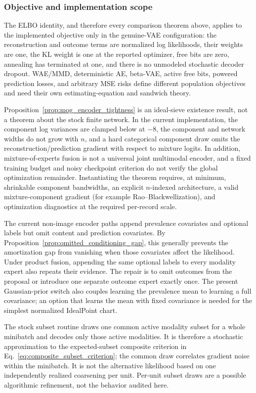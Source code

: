 \subsubsection{Objective and implementation scope}
\label{subsubsec:theory_code_scope}

The ELBO identity, and therefore every comparison theorem above, applies to
the implemented objective only in the genuine-VAE configuration: the
reconstruction and outcome terms are normalized log likelihoods, their
weights are one, the KL weight is one at the reported optimizer, free bits are
zero, annealing has terminated at one, and there is no unmodeled stochastic
decoder dropout.  WAE/MMD, deterministic AE, beta-VAE, active free bits,
powered prediction losses, and arbitrary MSE risks define different
population objectives and need their own estimating-equation and sandwich
theory.

Proposition~\ref{prop:mog_encoder_tightness} is an ideal-sieve existence
result, not a theorem about the stock finite network.  In the current
implementation, the component log variances are clamped below at $-8$, the
component and network widths do not grow with $n$, and a hard categorical
component draw omits the reconstruction/prediction gradient with respect to
mixture logits.  In addition, mixture-of-experts fusion is not a universal
joint multimodal encoder, and a fixed training budget and noisy checkpoint
criterion do not verify the global optimization remainder.  Instantiating the
theorem requires, at minimum, shrinkable component bandwidths, an explicit
$n$-indexed architecture, a valid mixture-component gradient (for example
Rao--Blackwellization), and optimization diagnostics at the required
per-record scale.

The current non-image encoder paths append prevalence covariates and optional
labels but omit content and prediction covariates.  By
Proposition~\ref{prop:omitted_conditioning_gap}, this generally prevents the
amortization gap from vanishing when those covariates affect the likelihood.
Under product fusion, appending the same optional labels to every modality
expert also repeats their evidence.  The repair is to omit outcomes from the
proposal or introduce one separate outcome expert exactly once.
The present Gaussian-prior switch also couples learning the prevalence mean
to learning a full covariance; an option that learns the mean with fixed
covariance is needed for the simplest normalized IdealPoint chart.

The stock subset routine draws one common active modality subset for a whole
minibatch and decodes only those active modalities.  It is therefore a
stochastic approximation to the expected-subset composite criterion in
Eq.~\eqref{eq:composite_subset_criterion}; the common draw correlates gradient
noise within the minibatch.  It is not the alternative likelihood based on one
independently realized coarsening per unit.  Per-unit subset draws are a
possible algorithmic refinement, not the behavior audited here.

